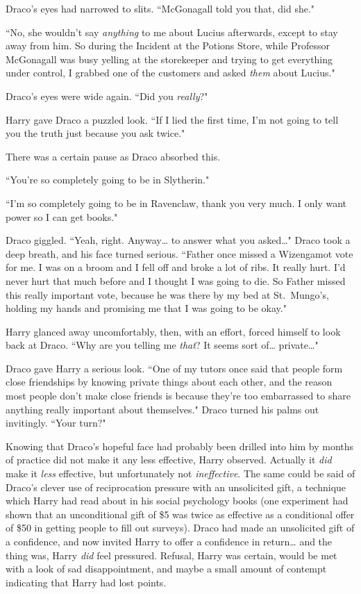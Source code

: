 Draco's eyes had narrowed to slits. ``McGonagall told you that, did she."

``No, she wouldn't say \emph{anything} to me about Lucius afterwards, except to stay away from him. So during the Incident at the Potions Store, while Professor McGonagall was busy yelling at the storekeeper and trying to get everything under control, I grabbed one of the customers and asked \emph{them} about Lucius."

Draco's eyes were wide again. ``Did you \emph{really}?"

Harry gave Draco a puzzled look. ``If I lied the first time, I'm not going to tell you the truth just because you ask twice."

There was a certain pause as Draco absorbed this.

``You're so completely going to be in Slytherin."

``I'm so completely going to be in Ravenclaw, thank you very much. I only want power so I can get books."

Draco giggled. ``Yeah, right. Anyway{\ldots} to answer what you asked{\ldots}" Draco took a deep breath, and his face turned serious. ``Father once missed a Wizengamot vote for me. I was on a broom and I fell off and broke a lot of ribs. It really hurt. I'd never hurt that much before and I thought I was going to die. So Father missed this really important vote, because he was there by my bed at St.~Mungo's, holding my hands and promising me that I was going to be okay."

Harry glanced away uncomfortably, then, with an effort, forced himself to look back at Draco. ``Why are you telling me \emph{that}? It seems sort of{\ldots} private{\ldots}"

Draco gave Harry a serious look. ``One of my tutors once said that people form close friendships by knowing private things about each other, and the reason most people don't make close friends is because they're too embarrassed to share anything really important about themselves." Draco turned his palms out invitingly. ``Your turn?"

Knowing that Draco's hopeful face had probably been drilled into him by months of practice did not make it any less effective, Harry observed. Actually it \emph{did} make it \emph{less} effective, but unfortunately not \emph{ineffective}. The same could be said of Draco's clever use of reciprocation pressure with an unsolicited gift, a technique which Harry had read about in his social psychology books (one experiment had shown that an unconditional gift of \$5 was twice as effective as a conditional offer of \$50 in getting people to fill out surveys). Draco had made an unsolicited gift of a confidence, and now invited Harry to offer a confidence in return{\ldots} and the thing was, Harry \emph{did} feel pressured. Refusal, Harry was certain, would be met with a look of sad disappointment, and maybe a small amount of contempt indicating that Harry had lost points.

